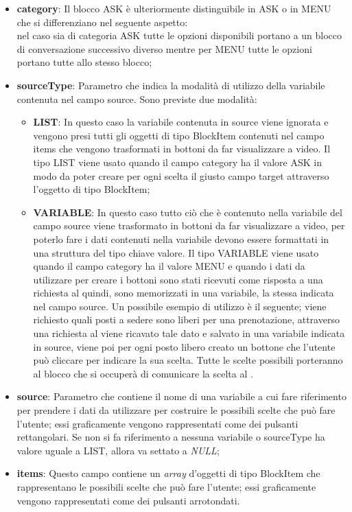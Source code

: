 \begin{itemize}
	\item \textbf{category}: Il blocco ASK è ulteriormente distinguibile in ASK o in MENU che si differenziano nel seguente aspetto:\\
	nel caso sia di categoria ASK tutte le opzioni disponibili portano a un blocco di conversazione successivo diverso mentre per MENU tutte le opzioni portano tutte allo stesso blocco;
	\item \textbf{sourceType}: Parametro che indica la modalità di utilizzo della variabile contenuta nel campo source.
	Sono previste due modalità:
	\begin{itemize}
		\item \textbf{LIST}: In questo caso la variabile contenuta in source viene ignorata e vengono presi tutti gli oggetti di tipo BlockItem contenuti nel campo items che vengono trasformati in bottoni da far visualizzare a video. Il tipo LIST viene usato quando il campo category ha il valore ASK in modo da poter creare per ogni scelta il giusto campo target attraverso l'oggetto di tipo BlockItem;
		\item \textbf{VARIABLE}: In questo caso tutto ciò che è contenuto nella variabile del campo source viene trasformato in bottoni da far visualizzare a video, per poterlo fare i dati contenuti nella variabile devono essere formattati in una struttura del tipo chiave valore. Il tipo VARIABLE viene usato quando il campo category ha il valore MENU e quando i dati da utilizzare per creare i bottoni sono stati ricevuti come risposta a una richiesta al  quindi, sono memorizzati in una variabile, la stessa indicata nel campo source. Un possibile esempio di utilizzo è il seguente; viene richiesto quali posti a sedere sono liberi per una prenotazione, attraverso una richiesta al  viene ricavato tale dato e salvato in una variabile indicata in source, viene poi per ogni posto libero creato un bottone che l'utente può cliccare per indicare la sua scelta. Tutte le scelte possibili porteranno al blocco che si occuperà di comunicare la scelta al .
	\end{itemize}	
	\item \textbf{source}: Parametro che contiene il nome di una variabile a cui fare riferimento per prendere i dati da utilizzare per costruire le possibili scelte che può fare l'utente; essi graficamente vengono rappresentati come dei pulsanti rettangolari. Se non si fa riferimento a nessuna variabile o sourceType ha valore uguale a LIST, allora va settato a \emph{NULL};
	\item \textbf{items}: Questo campo contiene un \emph{array} d'oggetti di tipo BlockItem che rappresentano le possibili scelte che può fare l'utente; essi graficamente vengono rappresentati come dei pulsanti arrotondati.


\end{itemize} 

